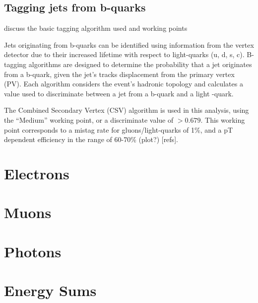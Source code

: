\subsection{Tagging jets from b-quarks}
discuss the basic tagging algorithm used and working points

Jets originating from b-quarks can be identified using information from the 
vertex detector due to their increased lifetime with respect to light-quarks (u,
d, s, c). 
B-tagging algorithms are designed to determine the probability that a jet 
originates from a b-quark, given the jet's tracks displacement from the primary 
vertex (PV). Each algorithm considers the event's hadronic topology and 
calculates a value used to discriminate between a jet from a b-quark and a light
-quark.

The Combined Secondary Vertex (CSV) algorithm is used in this analysis,
using the ``Medium'' working point, or a discriminate value of $>0.679$. This 
working point corresponds to a mistag rate for gluons/light-quarks of 1\%, and a
pT dependent efficiency in the range of 60-70\% (plot?) [refs].

\section{Electrons}  %
\label{sec:objects_electrons}

\alphat


\section{Muons}  %
\label{sec:objects_muons}


\section{Photons}  %
\label{sec:objects_photons}


\section{Energy Sums}  %
\label{sec:objects_energy_sums}

